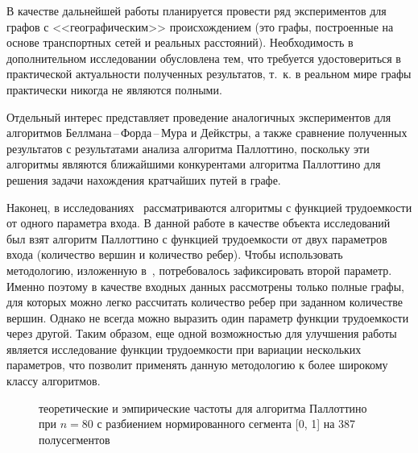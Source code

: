 \documentclass[a4paper,fontsize=14pt]{article}
\begin{document}
В качестве дальнейшей работы планируется провести ряд экспериментов для графов с <<географическим>> происхождением (это графы, построенные на основе транспортных сетей и реальных расстояний). Необходимость в дополнительном исследовании обусловлена тем, что требуется удостовериться в практической актуальности полученных результатов, т.~к. в реальном мире графы практически никогда не являются полными.

Отдельный интерес представляет проведение аналогичных экспериментов для алгоритмов Беллмана\,--\,Форда\,--\,Мура и Дейкстры, а также сравнение полученных результатов с результатами анализа алгоритма Паллоттино, поскольку эти алгоритмы являются ближайшими конкурентами алгоритма Паллоттино для решения задачи нахождения кратчайших путей в графе.

Наконец, в исследованиях~\cite{petrushyn_ulyanov_planning, petrushyn_ulyanov_analysis} рассматриваются алгоритмы с функцией трудоемкости от одного параметра входа. В данной работе в качестве объекта исследований был взят алгоритм Паллоттино с функцией трудоемкости от двух параметров входа (количество вершин и количество ребер). Чтобы использовать методологию, изложенную в~\cite{petrushyn_ulyanov_analysis}, потребовалось зафиксировать второй параметр. Именно поэтому в качестве входных данных рассмотрены только полные графы, для которых можно легко рассчитать количество ребер при заданном количестве вершин. Однако не всегда можно выразить один параметр функции трудоемкости через другой. Таким образом, еще одной возможностью для улучшения работы является исследование функции трудоемкости при вариации нескольких параметров, что позволит применять данную методологию к более широкому классу алгоритмов.

\begin{figure}[!]
	\caption{теоретические и эмпирические частоты для алгоритма Паллоттино при $n = 80$ с разбиением нормированного сегмента [0, 1] на 387 полусегментов}
	\label{image1}
\end{figure}
\end{document}
